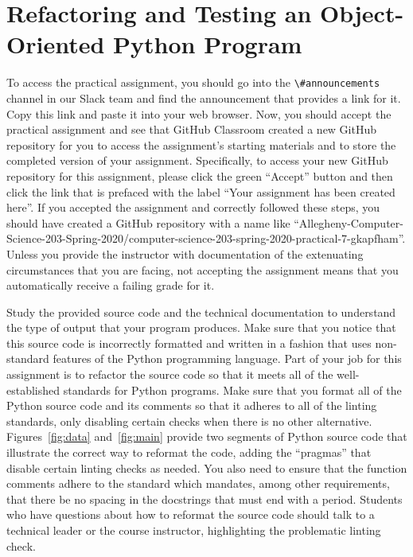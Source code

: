 \documentclass[11pt]{article}
\newcommand{\channel}[1]{\lstinline{#1}}
\begin{document}
\section*{Refactoring and Testing an Object-Oriented Python Program}

To access the practical assignment, you should go into the
\channel{\#announcements} channel in our Slack team and find the announcement
that provides a link for it. Copy this link and paste it into your web browser.
Now, you should accept the practical assignment and see that GitHub Classroom
created a new GitHub repository for you to access the assignment's starting
materials and to store the completed version of your assignment. Specifically,
to access your new GitHub repository for this assignment, please click the green
``Accept'' button and then click the link that is prefaced with the label ``Your
assignment has been created here''. If you accepted the assignment and correctly
followed these steps, you should have created a GitHub repository with a name
like
``Allegheny-Computer-Science-203-Spring-2020/computer-science-203-spring-2020-practical-7-gkapfham''.
Unless you provide the instructor with documentation of the extenuating
circumstances that you are facing, not accepting the assignment means that you
automatically receive a failing grade for it.

Study the provided source code and the technical documentation to understand the
type of output that your program produces.
%
Make sure that you notice that this source code is incorrectly formatted and
written in a fashion that uses non-standard features of the Python programming
language.
%
Part of your job for this assignment is to refactor the source code so that it
meets all of the well-established standards for Python programs.
%
Make sure that you format all of the Python source code and its comments so that
it adheres to all of the linting standards, only disabling certain checks when
there is no other alternative.
%
Figures~\ref{fig:data} and~\ref{fig:main} provide two segments of Python source
code that illustrate the correct way to reformat the code, adding the
``pragmas'' that disable certain linting checks as needed.
%
You also need to ensure that the function comments adhere to the standard which
mandates, among other requirements, that there be no spacing in the docstrings
that must end with a period.
%
Students who have questions about how to reformat the source code should talk to
a technical leader or the course instructor, highlighting the problematic
linting check.
\end{document}
